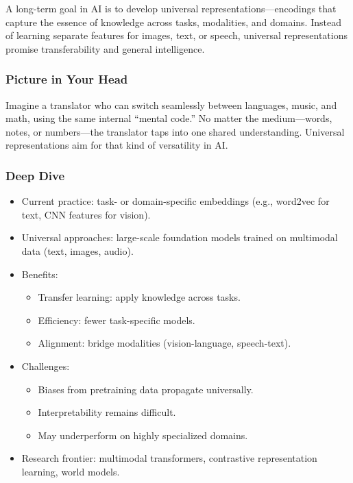 \documentclass[
  letterpaper,
  DIV=11,
  numbers=noendperiod]{scrreprt}
\providecommand{\tightlist}{%
  \setlength{\itemsep}{0pt}\setlength{\parskip}{0pt}}
\begin{document}
A long-term goal in AI is to develop universal
representations---encodings that capture the essence of knowledge across
tasks, modalities, and domains. Instead of learning separate features
for images, text, or speech, universal representations promise
transferability and general intelligence.

\subsubsection{Picture in Your Head}\label{picture-in-your-head-49}

Imagine a translator who can switch seamlessly between languages, music,
and math, using the same internal ``mental code.'' No matter the
medium---words, notes, or numbers---the translator taps into one shared
understanding. Universal representations aim for that kind of
versatility in AI.

\subsubsection{Deep Dive}\label{deep-dive-49}

\begin{itemize}
\item
  Current practice: task- or domain-specific embeddings (e.g., word2vec
  for text, CNN features for vision).
\item
  Universal approaches: large-scale foundation models trained on
  multimodal data (text, images, audio).
\item
  Benefits:

  \begin{itemize}
  \tightlist
  \item
    Transfer learning: apply knowledge across tasks.
  \item
    Efficiency: fewer task-specific models.
  \item
    Alignment: bridge modalities (vision-language, speech-text).
  \end{itemize}
\item
  Challenges:

  \begin{itemize}
  \tightlist
  \item
    Biases from pretraining data propagate universally.
  \item
    Interpretability remains difficult.
  \item
    May underperform on highly specialized domains.
  \end{itemize}
\item
  Research frontier: multimodal transformers, contrastive representation
  learning, world models.
\end{itemize}
\end{document}

